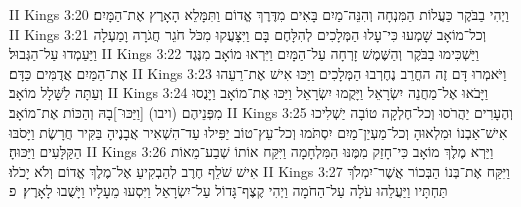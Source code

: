 II Kings 3:20	וַיְהִי בַבֹּקֶר כַּעֲלוֹת הַמִּנְחָה וְהִנֵּה־מַיִם בָּאִים מִדֶּרֶךְ אֱדוֹם וַתִּמָּלֵא הָאָרֶץ אֶת־הַמָּיִם׃
II Kings 3:21	וְכל־מוֹאָב שָׁמְעוּ כִּי־עָלוּ הַמְּלָכִים לְהִלָּחֶם בָּם וַיִּצָּעֲקוּ מִכֹּל חֹגֵר חֲגֹרָה וָמַעְלָה וַיַּעַמְדוּ עַל־הַגְּבוּל׃
II Kings 3:22	וַיַּשְׁכִּימוּ בַבֹּקֶר וְהַשֶּׁמֶשׁ זָרְחָה עַל־הַמָּיִם וַיִּרְאוּ מוֹאָב מִנֶּגֶד אֶת־הַמַּיִם אֲדֻמִּים כַּדָּם׃
II Kings 3:23	וַיֹּאמְרוּ דָּם זֶה החֳרֵב נֶחֶרְבוּ הַמְּלָכִים וַיַּכּוּ אִישׁ אֶת־רֵעֵהוּ וְעַתָּה לַשָּׁלָל מוֹאָב׃
II Kings 3:24	וַיָּבֹאוּ אֶל־מַחֲנֵה יִשְׂרָאֵל וַיָּקֻמוּ יִשְׂרָאֵל וַיַּכּוּ אֶת־מוֹאָב וַיָּנֻסוּ מִפְּנֵיהֶם (ויבו) [וַיַּכּוּ־]בָהּ וְהַכּוֹת אֶת־מוֹאָב׃
II Kings 3:25	וְהֶעָרִים יַהֲרֹסוּ וְכל־חֶלְקָה טוֹבָה יַשְׁלִיכוּ אִישׁ־אַבְנוֹ וּמִלְאוּהָ וְכל־מַעְיַן־מַיִם יִסְתֹּמוּ וְכל־עֵץ־טוֹב יַפִּילוּ עַד־הִשְׁאִיר אֲבָנֶיהָ בַּקִּיר חֲרָשֶׂת וַיָּסֹבּוּ הַקַּלָּעִים וַיַּכּוּהָ׃
II Kings 3:26	וַיַּרְא מֶלֶךְ מוֹאָב כִּי־חָזַק מִמֶּנּוּ הַמִּלְחָמָה וַיִּקַּח אוֹתוֹ שְׁבַע־מֵאוֹת אִישׁ שֹׁלֵף חֶרֶב לְהַבְקִיעַ אֶל־מֶלֶךְ אֱדוֹם וְלֹא יָכֹלוּ׃
II Kings 3:27	וַיִּקַּח אֶת־בְּנוֹ הַבְּכוֹר אֲשֶׁר־יִמְלֹךְ תַּחְתָּיו וַיַּעֲלֵהוּ עֹלָה עַל־הַחֹמָה וַיְהִי קֶצֶף־גָּדוֹל עַל־יִשְׂרָאֵל וַיִּסְעוּ מֵעָלָיו וַיָּשֻׁבוּ לָאָרֶץ׃ {פ}
